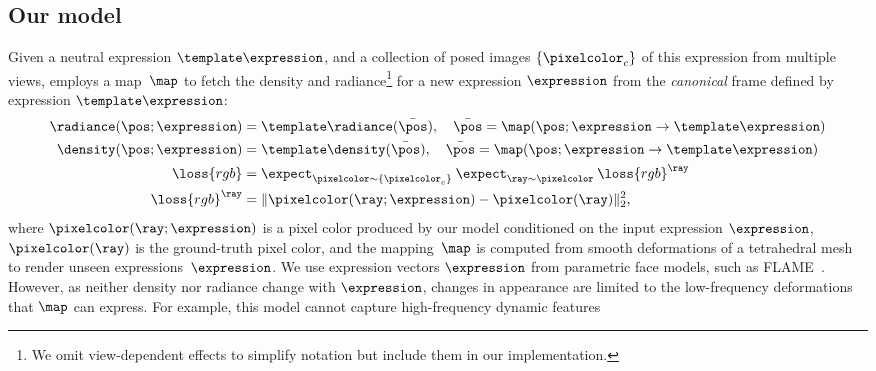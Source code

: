   \subsection{Our model}
    \label{sec:blendfields-model}
    Given a neutral expression $\template\expression$, and a collection of
    posed images $\{\pixelcolor_c\}$ of this expression from multiple views,
    \VolTeMorph employs a map~$\map$ to fetch the density and
    radiance\footnote{We omit view-dependent effects to simplify notation but
    include them in our implementation.
    } for a new expression $\expression$ from the \textit{canonical} frame defined by expression $\template\expression$:
    \begin{align}
      \radiance(\pos; \expression) & = \template\radiance(\bar\pos), \quad \bar\pos = \map(\pos; \expression \rightarrow \template\expression)
      \\
      \density(\pos; \expression)  & = \template\density(\bar\pos), \quad \bar\pos = \map(\pos; \expression \rightarrow \template\expression)
      \label{eq:blendfields-densityVoltemorph}
      \\
      \loss{rgb}                   & =
      \expect_{\pixelcolor \sim \{\pixelcolor_c\}} \:
      \expect_{\ray \sim \pixelcolor} \:
      \loss{rgb}^\ray
      \\
      \loss{rgb}^\ray              & = \| \pixelcolor(\ray; \expression) - \pixelcolor(\ray) \|_2^2,
    \end{align}
    where $\pixelcolor(\ray; \expression)$ is a pixel color produced by our model conditioned on the input expression $\expression$, $\pixelcolor(\ray)$ is the ground-truth pixel color, and the mapping~$\map$ is computed from smooth deformations of a tetrahedral mesh to render unseen expressions~$\expression$.
    We use expression vectors $\expression$ from parametric face models, such
    as FLAME~\cite{li2017flame,fakeItTillYouMakeIt}.
    However, as neither density nor radiance change with $\expression$,
    changes in appearance are limited to the low-frequency deformations that
    $\map$ can express.
    For example, this model cannot capture high-frequency dynamic features
